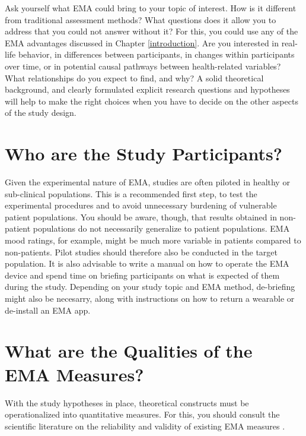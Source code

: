 \documentclass[]{book}
\begin{document}
Ask yourself what EMA could bring to your topic of interest. How is it
different from traditional assessment methods? What questions does it
allow you to address that you could not answer without it? For this, you
could use any of the EMA advantages discussed in Chapter
\ref{introduction}. Are you interested in real-life behavior, in
differences between participants, in changes within participants over
time, or in potential causal pathways between health-related variables?
What relationships do you expect to find, and why? A solid theoretical
background, and clearly formulated explicit research questions and
hypotheses will help to make the right choices when you have to decide
on the other aspects of the study design.

\section{Who are the Study
Participants?}\label{who-are-the-study-participants}

Given the experimental nature of EMA, studies are often piloted in
healthy or sub-clinical populations. This is a recommended first step,
to test the experimental procedures and to avoid unnecessary burdening
of vulnerable patient populations. You should be aware, though, that
results obtained in non-patient populations do not necessarily
generalize to patient populations. EMA mood ratings, for example, might
be much more variable in patients compared to non-patients. Pilot
studies should therefore also be conducted in the target population. It
is also advisable to write a manual on how to operate the EMA device and
spend time on briefing participants on what is expected of them during
the study. Depending on your study topic and EMA method, de-briefing
might also be necesarry, along with instructions on how to return a
wearable or de-install an EMA app.

\section{What are the Qualities of the EMA
Measures?}\label{what-are-the-qualities-of-the-ema-measures}

  

With the study hypotheses in place, theoretical constructs must be
operationalized into quantitative measures. For this, you should consult
the scientific literature on the reliability and validity of existing
EMA measures \citep[e.g.,][]{Moore2016, Rijsbergen2012}.
\end{document}
